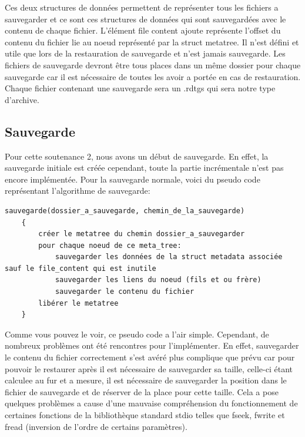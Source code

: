         Ces deux structures de données permettent de représenter tous les fichiers a sauvegarder et ce sont ces structures de données qui sont sauvegardées avec le contenu de chaque fichier. L'élément file content ajoute représente l'offset du contenu du fichier lie au noeud représenté par la struct metatree. Il n'est défini et utile que lors de la restauration de sauvegarde et n'est jamais sauvegarde.
        Les fichiers de sauvegarde devront être tous places dans un même dossier pour chaque sauvegarde car il est nécessaire de toutes les avoir a portée en cas de restauration. Chaque fichier contenant une sauvegarde sera un .rdtgs qui sera notre type d'archive.
    \subsection{Sauvegarde}
        Pour cette soutenance 2, nous avons un début de sauvegarde. En effet, la sauvegarde initiale est créée cependant, toute la partie incrémentale n'est pas encore implémentée. Pour la sauvegarde normale, voici du pseudo code représentant l'algorithme de sauvegarde:
        
        \newpage
        \begin{lstlisting}[style=CStyle]
    sauvegarde(dossier_a_sauvegarde, chemin_de_la_sauvegarde)
    {
        créer le metatree du chemin dossier_a_sauvegarder
        pour chaque noeud de ce meta_tree:
            sauvegarder les données de la struct metadata associée sauf le file_content qui est inutile
            sauvegarder les liens du noeud (fils et ou frère)
            sauvegarder le contenu du fichier
        libérer le metatree
    }
		\end{lstlisting}
		Comme vous pouvez le voir, ce pseudo code a l'air simple. Cependant, de nombreux problèmes ont été rencontres pour l'implémenter. En effet, sauvegarder le contenu du fichier correctement s'est avéré plus complique que prévu car pour pouvoir le restaurer après il est nécessaire de sauvegarder sa taille, celle-ci étant calculee au fur et a mesure, il est nécessaire de sauvegarder la position dans le fichier de sauvegarde et de réserver de la place pour cette taille. Cela a pose quelques problèmes a cause d'une mauvaise compréhension du fonctionnement de certaines fonctions de la bibliothèque standard stdio telles que fseek, fwrite et fread (inversion de l'ordre de certains paramètres). 
